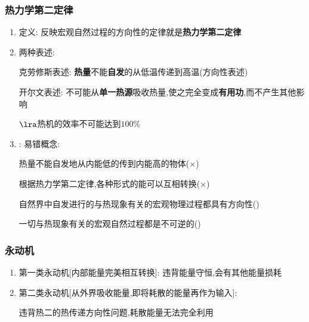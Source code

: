 \documentclass{article}
\begin{document}
\subsubsection{热力学第二定律}
\begin{enumerate}[label = \arabic*]
    \item 定义: 反映宏观自然过程的方向性的定律就是\textbf{热力学第二定律}
    \item 两种表述:

          \hspace{2.7em}克劳修斯表述: \textbf{热量}不能\textbf{自发}的从低温传递到高温(方向性表述)

          \hspace{2.7em}开尔文表述: 不可能从\textbf{单一热源}吸收热量,使之完全变成\textbf{有用功},而不产生其他影响

          \hspace{8.4em}$\lra$热机的效率不可能达到$100 \%$
    \item: 易错概念:

          \hspace{4.7em}热量不能自发地从内能低的传到内能高的物体($\times$)

          \hspace{4.7em}根据热力学第二定律,各种形式的能可以互相转换($\times$)

          \hspace{4.7em}自然界中自发进行的与热现象有关的宏观物理过程都具有方向性(\checkmark)

          \hspace{4.7em}一切与热现象有关的宏观自然过程都是不可逆的(\checkmark)
\end{enumerate}

\vspace{2em}

\subsubsection{永动机}

\begin{enumerate}[label = (\arabic*)]
    \item 第一类永动机[内部能量完美相互转换]: 违背能量守恒,会有其他能量损耗
    \item 第二类永动机[从外界吸收能量,即将耗散的能量再作为输入]:

          \hspace{6.2em}违背热二的热传递方向性问题,耗散能量无法完全利用
\end{enumerate}
\end{document}
